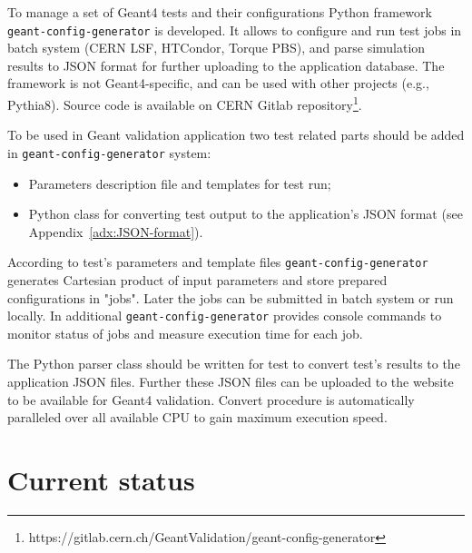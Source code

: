 To manage a set of Geant4 tests and their configurations Python framework {\tt geant-config-generator} is developed. It allows to configure and run test jobs in batch system (CERN LSF, HTCondor, Torque PBS), and parse simulation results to JSON format for further uploading to the application database.
The framework is not Geant4-specific, and can be used with other projects (e.g., Pythia8). Source code is available on
CERN Gitlab repository\footnote{https://gitlab.cern.ch/GeantValidation/geant-config-generator}.

To be used in Geant validation application two test related parts should be added in {\tt geant-config-generator} system:

\begin{itemize}
	\item Parameters description file and templates for test run;
	\item Python class for converting test output to the application's JSON format (see Appendix~\ref{adx:JSON-format}).
\end{itemize}

According to test's parameters and template files {\tt geant-config-generator} generates Cartesian product of input parameters and store prepared configurations in "jobs". Later the jobs can be submitted in batch system or run locally. In additional {\tt geant-config-generator} provides console commands to monitor status of jobs and measure execution time for each job.

The Python parser class should be written for test to convert test's results to the application JSON files. Further these JSON files can be uploaded to the website to be available for Geant4 validation.
Convert procedure is automatically paralleled over all available CPU to gain maximum execution speed.




\section{Current status}
\label{sec-status}


